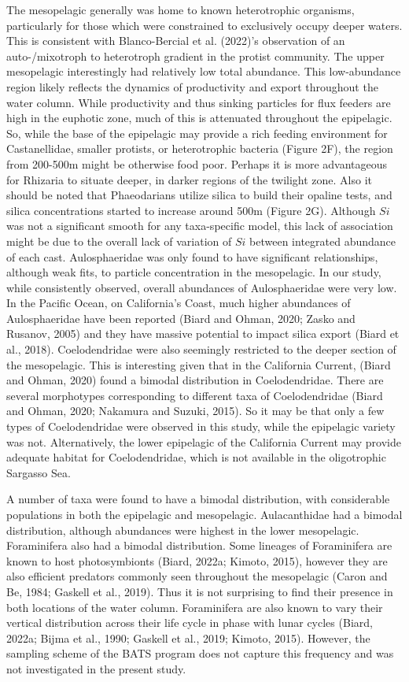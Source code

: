 \documentclass[
]{article}
\begin{document}
The mesopelagic generally was home to known heterotrophic organisms,
particularly for those which were constrained to exclusively occupy
deeper waters. This is consistent with Blanco-Bercial et al. (2022)'s
observation of an auto-/mixotroph to heterotroph gradient in the protist
community. The upper mesopelagic interestingly had relatively low total
abundance. This low-abundance region likely reflects the dynamics of
productivity and export throughout the water column. While productivity
and thus sinking particles for flux feeders are high in the euphotic
zone, much of this is attenuated throughout the epipelagic. So, while
the base of the epipelagic may provide a rich feeding environment for
Castanellidae, smaller protists, or heterotrophic bacteria (Figure 2F),
the region from 200-500m might be otherwise food poor. Perhaps it is
more advantageous for Rhizaria to situate deeper, in darker regions of
the twilight zone. Also it should be noted that Phaeodarians utilize
silica to build their opaline tests, and silica concentrations started
to increase around 500m (Figure 2G). Although \(Si\) was not a
significant smooth for any taxa-specific model, this lack of association
might be due to the overall lack of variation of \(Si\) between
integrated abundance of each cast. Aulosphaeridae was only found to have
significant relationships, although weak fits, to particle concentration
in the mesopelagic. In our study, while consistently observed, overall
abundances of Aulosphaeridae were very low. In the Pacific Ocean, on
California's Coast, much higher abundances of Aulosphaeridae have been
reported (Biard and Ohman, 2020; Zasko and Rusanov, 2005) and they have
massive potential to impact silica export (Biard et al., 2018).
Coelodendridae were also seemingly restricted to the deeper section of
the mesopelagic. This is interesting given that in the California
Current, (Biard and Ohman, 2020) found a bimodal distribution in
Coelodendridae. There are several morphotypes corresponding to different
taxa of Coelodendridae (Biard and Ohman, 2020; Nakamura and Suzuki,
2015). So it may be that only a few types of Coelodendridae were
observed in this study, while the epipelagic variety was not.
Alternatively, the lower epipelagic of the California Current may
provide adequate habitat for Coelodendridae, which is not available in
the oligotrophic Sargasso Sea.

A number of taxa were found to have a bimodal distribution, with
considerable populations in both the epipelagic and mesopelagic.
Aulacanthidae had a bimodal distribution, although abundances were
highest in the lower mesopelagic. Foraminifera also had a bimodal
distribution. Some lineages of Foraminifera are known to host
photosymbionts (Biard, 2022a; Kimoto, 2015), however they are also
efficient predators commonly seen throughout the mesopelagic (Caron and
Be, 1984; Gaskell et al., 2019). Thus it is not surprising to find their
presence in both locations of the water column. Foraminifera are also
known to vary their vertical distribution across their life cycle in
phase with lunar cycles (Biard, 2022a; Bijma et al., 1990; Gaskell et
al., 2019; Kimoto, 2015). However, the sampling scheme of the BATS
program does not capture this frequency and was not investigated in the
present study.
\end{document}
